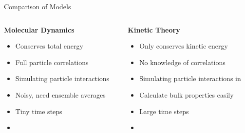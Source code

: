 \documentclass{beamer}
\begin{document}
	\begin{frame}{Comparison of Models}
		\begin{columns}
			\begin{column}{0.55\textwidth}
				\begin{center}\textbf{Molecular Dynamics}\end{center}\vspace{-0.8em}
				\begin{itemize}
					\item  \color{blue}Conserves total energy
					\vspace{0.2em}
					\item  Full particle correlations
					\vspace{0.2em}
					\item  Simulating particle interactions 
					\vspace{0.2em}
					\item  \color{red}Noisy, need ensemble averages
					\vspace{0.2em}
					\item  Tiny time steps
					\vspace{0.2em}
					\item  {}
				\end{itemize}
			\end{column}
			\begin{column}{0.55\textwidth}
				\begin{center}\textbf{Kinetic Theory}\end{center}\vspace{-0.8em}
				\begin{itemize}
					\item  \color{red}Only conserves kinetic energy
					\vspace{0.2em}
					\item  No knowledge of correlations
					\vspace{0.2em}
					\item  Simulating particle interactions in 
					\vspace{0.2em}
					\item  \color{blue} Calculate bulk properties easily
					\vspace{0.2em}
					\item  Large time steps
					\vspace{0.2em}
					\item  {}
				\end{itemize}

\end{column}
\end{columns}
\end{frame}
\end{document}
